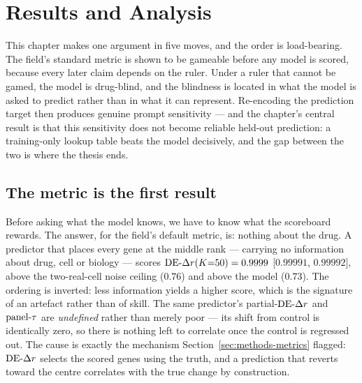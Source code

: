 \section{Results and Analysis}
\label{sec:results}

This chapter makes one argument in five moves, and the order is load-bearing. The field's standard
metric is shown to be gameable before any model is scored, because every later claim depends on the
ruler. Under a ruler that cannot be gamed, the model is drug-blind, and the blindness is located in
what the model is asked to predict rather than in what it can represent. Re-encoding the prediction
target then produces genuine prompt sensitivity --- and the chapter's central result is that this
sensitivity does not become reliable held-out prediction: a training-only lookup table beats the
model decisively, and the gap between the two is where the thesis ends.

\subsection{The metric is the first result}
\label{sec:res-metrics}

Before asking what the model knows, we have to know what the scoreboard rewards. The answer, for
the field's default metric, is: nothing about the drug. A predictor that places every gene at the
middle rank --- carrying no information about drug, cell or biology --- scores $\textrm{DE-}\Delta r(K{=}50) =
0.9999$ [$0.99991$, $0.99992$], above the two-real-cell noise ceiling ($0.76$) and above the model
($0.73$). The ordering is inverted: less information yields a higher score, which is the signature
of an artefact rather than of skill. The same predictor's partial-$\textrm{DE-}\Delta r$ and $\textrm{panel-}\tau$ are
\emph{undefined} rather than merely poor --- its shift from control is identically zero, so there
is nothing left to correlate once the control is regressed out. The cause is exactly the mechanism
Section~\ref{sec:methods-metrics} flagged: $\textrm{DE-}\Delta r$ selects the scored genes using the truth, and a
prediction that reverts toward the centre correlates with the true change by construction.


